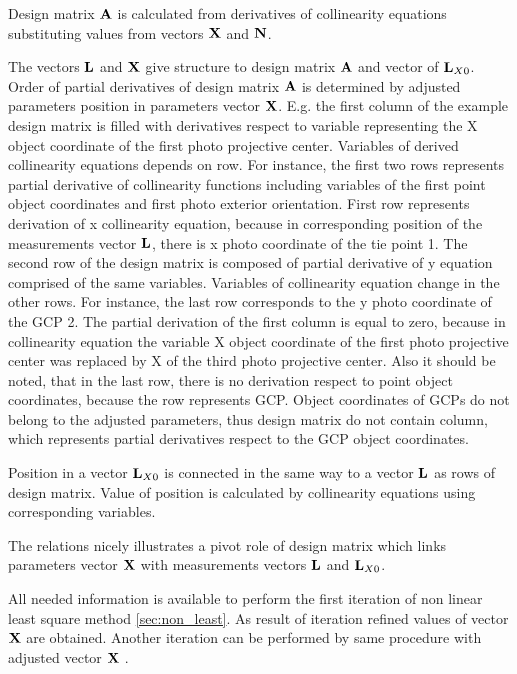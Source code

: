 \documentclass[a4paper,12pt]{article}
\newcommand{\evect}[1]{
{\bf #1}
}
\begin{document}
Design matrix $\evect{A}$ is calculated from 
derivatives of collinearity equations substituting values from vectors $\evect{X}$ and $\evect{N}$.

The vectors  $\evect{L}$ and  $\evect{X}$ give structure to design matrix $\evect{A}$ and
vector of $\evect{L}_{X0}$.
Order of partial derivatives of design matrix $\evect{A}$  is determined by adjusted parameters position in 
parameters vector $\evect{X}$. E.g. the first column of the example design matrix is filled with derivatives respect 
to variable representing the  X object coordinate of the first photo projective center. Variables of derived collinearity equations
depends on row. For instance, the first two rows represents partial derivative of collinearity functions 
including variables of the first point object coordinates  and first photo exterior orientation.  First row represents  
derivation of x collinearity equation, because in corresponding position of the measurements vector $\evect{L}$, there is 
x photo coordinate of the tie point 1. The second row of the design matrix is composed of 
partial derivative of y equation comprised of the same variables. 
Variables of collinearity equation change in the other rows. For instance, the last row corresponds to the 
y photo coordinate of the GCP 2. The partial derivation of the first column is equal 
to zero, because in collinearity equation the variable X object coordinate of the first photo projective center was replaced 
by X of the third photo projective center. Also it should be noted, that in the last row, there is no derivation 
respect to point object coordinates, because the row represents GCP. Object coordinates of GCPs do not 
belong to the adjusted parameters, thus design matrix do not contain column, which represents partial 
derivatives respect to the GCP object coordinates.


Position in a vector $\evect{L}_{X0}$ is connected in the same way to a vector $\evect{L}$ as rows of design matrix.
Value of position is calculated by collinearity equations using corresponding variables.



The relations nicely illustrates a pivot role of design matrix which links parameters vector $\evect{X}$ 
with measurements vectors $\evect{L}$ and $\evect{L}_{X0}$.

All needed information is available to perform the first iteration of non linear least square 
method \ref{sec:non_least}. As result of iteration refined values of vector  $\evect{X}$
are obtained. Another iteration can be  performed by same procedure  with adjusted vector $\evect{X}$
.
\end{document}
